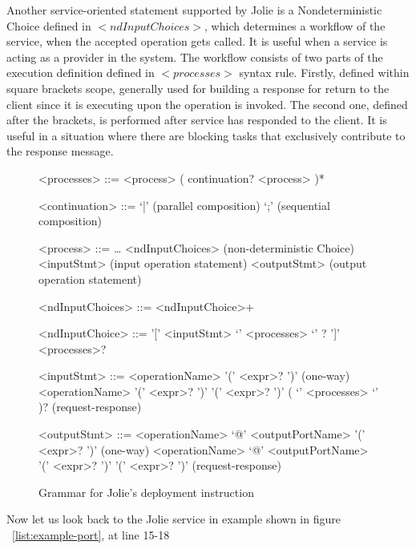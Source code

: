 Another service-oriented statement supported by Jolie is a Nondeterministic Choice defined in \(<ndInputChoices>\), which determines a workflow of the service, when the accepted operation gets called. It is useful when a service is acting as a provider in the system. The workflow consists of two parts of the execution definition defined in \(<processes>\) syntax rule. Firstly, defined within square brackets scope, generally used for building a response for return to the client since it is executing upon the operation is invoked. The second one, defined after the brackets, is performed after service has responded to the client. It is useful in a situation where there are blocking tasks that exclusively contribute to the response message.

\begin{figure}[h]
    \begin{framed}
        \begin{grammar}
            <processes>
            ::= <process> ( continuation? <process> )*

            <continuation> ::= `|' \hfill (parallel composition)
            \alt `;' \hfill (sequential composition)

            <process> ::= \dots
            \alt <ndInputChoices> \hfill (non-deterministic Choice)
            \alt <inputStmt> \hfill (input operation statement)
            \alt <outputStmt> \hfill (output operation statement)

            <ndInputChoices>
            ::= <ndInputChoice>+

            <ndInputChoice>
            ::= '[' <inputStmt> `{' <processes> `}' ? ']' <processes>?

            <inputStmt>
            ::= <operationName> '(' <expr>? ')' \hfill (one-way)
            \alt
            <operationName> '(' <expr>? ')' '(' <expr>? ')' ( `{' <processes> `}' )? \hfill (request-response)

            <outputStmt>
            ::= <operationName> `@' <outputPortName> '(' <expr>? ')' \hfill (one-way)
            \alt
            <operationName> `@' <outputPortName> '(' <expr>? ')' '(' <expr>? ')' \hfill (request-response)
        \end{grammar}
    \end{framed}
    \caption{Grammar for Jolie's deployment instruction}
    \label{fig:jolie-process}
\end{figure}

Now let us look back to the Jolie service in example shown in figure ~\ref{list:example-port}, at line 15-18


